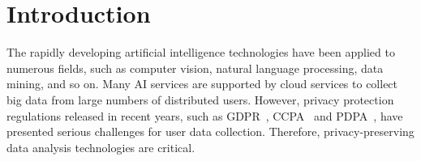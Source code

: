 \section{Introduction}

The rapidly developing artificial intelligence technologies have been applied to numerous fields, such as computer vision, natural language processing, data mining, and so on. %
Many AI services are supported by cloud services to collect big data from large numbers of distributed users. However, privacy protection regulations released in recent years, such as GDPR~\cite{GDPR}, CCPA~\cite{CCPA} and PDPA~\cite{PDPA}, have presented serious challenges for user data collection. Therefore, privacy-preserving data analysis technologies are critical. 


